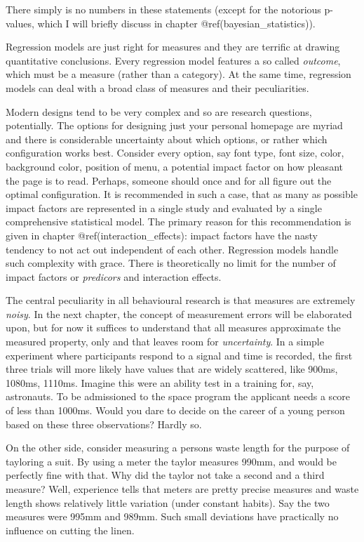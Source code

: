 \documentclass[]{svmono}
\begin{document}
There simply is no numbers in these statements (except for the notorious
p-values, which I will briefly discuss in chapter
@ref(bayesian\_statistics)).

Regression models are just right for measures and they are terrific at
drawing quantitative conclusions. Every regression model features a so
called \emph{outcome}, which must be a measure (rather than a category).
At the same time, regression models can deal with a broad class of
measures and their peculiarities.

Modern designs tend to be very complex and so are research questions,
potentially. The options for designing just your personal homepage are
myriad and there is considerable uncertainty about which options, or
rather which configuration works best. Consider every option, say font
type, font size, color, background color, position of menu, a potential
impact factor on how pleasant the page is to read. Perhaps, someone
should once and for all figure out the optimal configuration. It is
recommended in such a case, that as many as possible impact factors are
represented in a single study and evaluated by a single comprehensive
statistical model. The primary reason for this recommendation is given
in chapter @ref(interaction\_effects): impact factors have the nasty
tendency to not act out independent of each other. Regression models
handle such complexity with grace. There is theoretically no limit for
the number of impact factors or \emph{predicors} and interaction
effects.

The central peculiarity in all behavioural research is that measures are
extremely \emph{noisy}. In the next chapter, the concept of measurement
errors will be elaborated upon, but for now it suffices to understand
that all measures approximate the measured property, only and that
leaves room for \emph{uncertainty}. In a simple experiment where
participants respond to a signal and time is recorded, the first three
trials will more likely have values that are widely scattered, like
900ms, 1080ms, 1110ms. Imagine this were an ability test in a training
for, say, astronauts. To be admissioned to the space program the
applicant needs a score of less than 1000ms. Would you dare to decide on
the career of a young person based on these three observations? Hardly
so.

On the other side, consider measuring a persons waste length for the
purpose of tayloring a suit. By using a meter the taylor measures 990mm,
and would be perfectly fine with that. Why did the taylor not take a
second and a third measure? Well, experience tells that meters are
pretty precise measures and waste length shows relatively little
variation (under constant habits). Say the two measures were 995mm and
989mm. Such small deviations have practically no influence on cutting
the linen.
\end{document}
